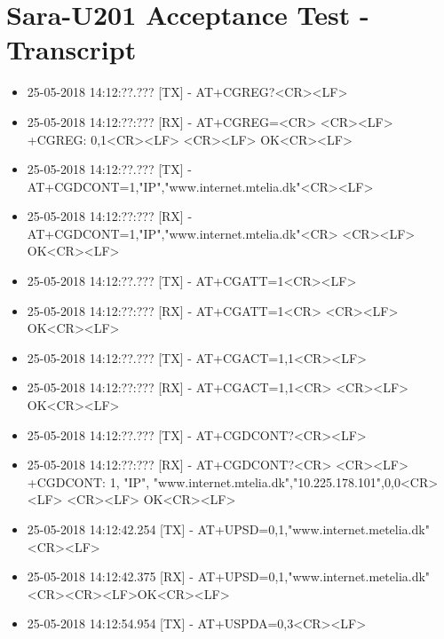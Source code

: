 \chapter{Sara-U201 Acceptance Test - Transcript}
\label{app:GSMcomm}
\begin{itemize}
	\item 25-05-2018 14:12:??.??? [TX] - AT+CGREG?<CR><LF>
	\item 25-05-2018 14:12:??:??? [RX] - AT+CGREG=<CR> \newline <CR><LF> \newline +CGREG: 0,1<CR><LF> \newline <CR><LF> \newline OK<CR><LF>
	\item 25-05-2018 14:12:??.??? [TX] - AT+CGDCONT=1,"IP","www.internet.mtelia.dk"<CR><LF>
	\item 25-05-2018 14:12:??:??? [RX] - AT+CGDCONT=1,"IP","www.internet.mtelia.dk"<CR> \newline <CR><LF> \newline OK<CR><LF>
	\item 25-05-2018 14:12:??.??? [TX] - AT+CGATT=1<CR><LF>
	\item 25-05-2018 14:12:??:??? [RX] - AT+CGATT=1<CR> \newline <CR><LF> \newline OK<CR><LF>
	\item 25-05-2018 14:12:??.??? [TX] - AT+CGACT=1,1<CR><LF>
	\item 25-05-2018 14:12:??:??? [RX] - AT+CGACT=1,1<CR> \newline <CR><LF> \newline OK<CR><LF>
	\item 25-05-2018 14:12:??.??? [TX] - AT+CGDCONT?<CR><LF>
	\item 25-05-2018 14:12:??:??? [RX] - AT+CGDCONT?<CR> \newline <CR><LF> \newline +CGDCONT: 1, "IP", "www.internet.mtelia.dk","10.225.178.101",0,0<CR><LF> \newline <CR><LF> \newline OK<CR><LF>
	\item 25-05-2018 14:12:42.254 [TX] - AT+UPSD=0,1,"www.internet.metelia.dk"<CR><LF>
	\item 25-05-2018 14:12:42.375 [RX] - AT+UPSD=0,1,"www.internet.metelia.dk"<CR>\newline <CR><LF>\newline OK<CR><LF>
	\item 25-05-2018 14:12:54.954 [TX] - AT+USPDA=0,3<CR><LF>

\end{itemize}
